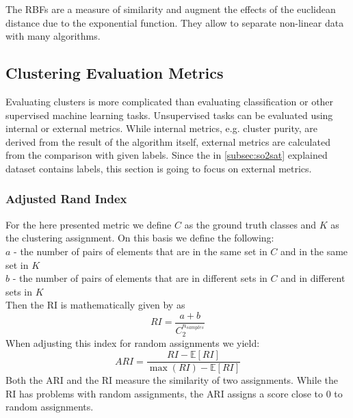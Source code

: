 The \glspl{RBF} are a measure of similarity and augment the effects of the euclidean distance due to the exponential function.
They allow to separate non-linear data with many algorithms.


\subsection{Clustering Evaluation Metrics}
\label{subsec:clustering_evaluation_metrics}

Evaluating clusters is more complicated than evaluating classification or other supervised machine learning tasks.
Unsupervised tasks can be evaluated using internal or external metrics.
While internal metrics, e.g. cluster purity, are derived from the result of the algorithm itself, external metrics are calculated from the comparison with given labels.
Since the in \cref{subsec:so2sat} explained dataset contains labels, this section is going to focus on external metrics.



\subsubsection{Adjusted Rand Index}
For the here presented metric we define \(C\) as the ground truth classes and \(K\) as the clustering assignment.
On this basis we define the following:\\
\(a\) - the number of pairs of elements that are in the same set in \(C\) and in the same set in \(K\)\\
\(b\) - the number of pairs of elements that are in different sets in \(C\) and in different sets in \(K\)\\
Then the \gls{RI} is mathematically given by \cite{noauthor_23_2020} as
\[RI = \frac{a + b}{C_2^{n_{samples}}}\]
When adjusting this index for random assignments we yield:
\[ARI = \frac{RI - \mathbb{E} [RI]}{\max (RI) - \mathbb{E} [RI]}\]
Both the \gls{ARI} and the \gls{RI} measure the similarity of two assignments.
While the \gls{RI} has problems with random assignments, the \gls{ARI} assigns a score close to \(0\)
to random assignments.


